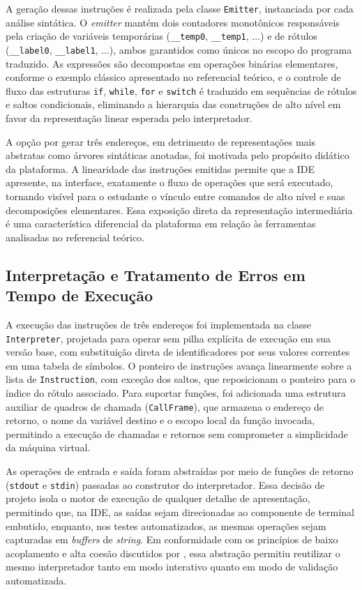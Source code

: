 A geração dessas instruções é realizada pela classe \texttt{Emitter}, instanciada por cada análise sintática. O \textit{emitter} mantém dois contadores monotônicos responsáveis pela criação de variáveis temporárias (\texttt{\_\_temp0}, \texttt{\_\_temp1}, $\ldots$) e de rótulos (\texttt{\_\_label0}, \texttt{\_\_label1}, $\ldots$), ambos garantidos como únicos no escopo do programa traduzido. As expressões são decompostas em operações binárias elementares, conforme o exemplo clássico apresentado no referencial teórico, e o controle de fluxo das estruturas \texttt{if}, \texttt{while}, \texttt{for} e \texttt{switch} é traduzido em sequências de rótulos e saltos condicionais, eliminando a hierarquia das construções de alto nível em favor da representação linear esperada pelo interpretador.

A opção por gerar três endereços, em detrimento de representações mais abstratas como árvores sintáticas anotadas, foi motivada pelo propósito didático da plataforma. A linearidade das instruções emitidas permite que a IDE apresente, na interface, exatamente o fluxo de operações que será executado, tornando visível para o estudante o vínculo entre comandos de alto nível e suas decomposições elementares. Essa exposição direta da representação intermediária é uma característica diferencial da plataforma em relação às ferramentas analisadas no referencial teórico.

\subsection{Interpretação e Tratamento de Erros em Tempo de Execução}
\label{subsec:interpretacao}

A execução das instruções de três endereços foi implementada na classe \texttt{Interpreter}, projetada para operar sem pilha explícita de execução em sua versão base, com substituição direta de identificadores por seus valores correntes em uma tabela de símbolos. O ponteiro de instruções avança linearmente sobre a lista de \texttt{Instruction}, com exceção dos saltos, que reposicionam o ponteiro para o índice do rótulo associado. Para suportar funções, foi adicionada uma estrutura auxiliar de quadros de chamada (\texttt{CallFrame}), que armazena o endereço de retorno, o nome da variável destino e o escopo local da função invocada, permitindo a execução de chamadas e retornos sem comprometer a simplicidade da máquina virtual.

As operações de entrada e saída foram abstraídas por meio de funções de retorno (\texttt{stdout} e \texttt{stdin}) passadas ao construtor do interpretador. Essa decisão de projeto isola o motor de execução de qualquer detalhe de apresentação, permitindo que, na IDE, as saídas sejam direcionadas ao componente de terminal embutido, enquanto, nos testes automatizados, as mesmas operações sejam capturadas em \textit{buffers} de \textit{string}. Em conformidade com os princípios de baixo acoplamento e alta coesão discutidos por , essa abstração permitiu reutilizar o mesmo interpretador tanto em modo interativo quanto em modo de validação automatizada.

